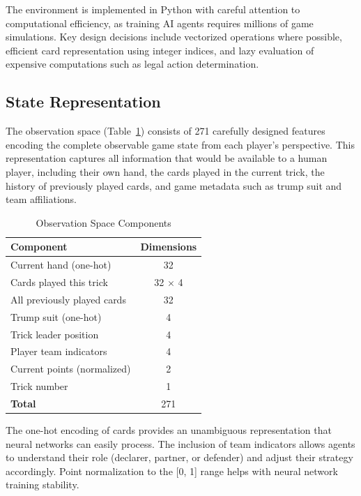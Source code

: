 \documentclass[conference]{IEEEtran}
\begin{document}
The environment is implemented in Python with careful attention to computational efficiency, as training AI agents requires millions of game simulations. Key design decisions include vectorized operations where possible, efficient card representation using integer indices, and lazy evaluation of expensive computations such as legal action determination.

\subsection{State Representation}

The observation space (Table~\ref{tab:observation}) consists of 271 carefully designed features encoding the complete observable game state from each player's perspective. This representation captures all information that would be available to a human player, including their own hand, the cards played in the current trick, the history of previously played cards, and game metadata such as trump suit and team affiliations.

\begin{table}[htbp]
\caption{Observation Space Components}
\begin{center}
\begin{tabular}{lc}
\toprule
\textbf{Component} & \textbf{Dimensions} \\
\midrule
Current hand (one-hot) & 32 \\
Cards played this trick & 32 $\times$ 4 \\
All previously played cards & 32 \\
Trump suit (one-hot) & 4 \\
Trick leader position & 4 \\
Player team indicators & 4 \\
Current points (normalized) & 2 \\
Trick number & 1 \\
\midrule
\textbf{Total} & 271 \\
\bottomrule
\end{tabular}
\label{tab:observation}
\end{center}
\end{table}

The one-hot encoding of cards provides an unambiguous representation that neural networks can easily process. The inclusion of team indicators allows agents to understand their role (declarer, partner, or defender) and adjust their strategy accordingly. Point normalization to the [0, 1] range helps with neural network training stability.
\end{document}
